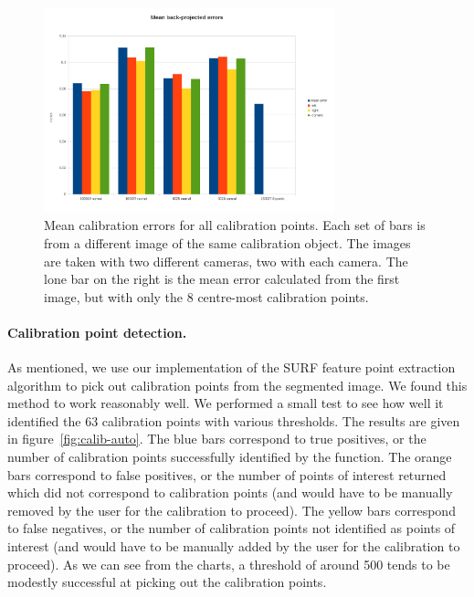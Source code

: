 \begin{figure}[htb]
  \centering
  \includegraphics[width=0.75\textwidth]{figures/calibration-means}
  \caption[Mean calibration errors]{Mean calibration errors for all
    calibration points. Each set of bars is from a different image of
    the same calibration object. The images are taken with two
    different cameras, two with each camera. The lone bar on the right
    is the mean error calculated from the first image, but with only
    the 8 centre-most calibration points.}
  \label{fig:calib-errors}
\end{figure}

\paragraph{Calibration point detection.}
As mentioned, we use our implementation of the SURF feature point extraction algorithm to pick out calibration points from the segmented image. We found this method to work reasonably well. We performed a small test to see how well it identified the 63 calibration points with various thresholds. The results are given in figure~\ref{fig:calib-auto}. The blue bars correspond to true positives, or the number of calibration points successfully identified by the function. The orange bars correspond to false positives, or the number of points of interest returned which did not correspond to calibration points (and would have to be manually removed by the user for the calibration to proceed). The yellow bars correspond to false negatives, or the number of calibration points not identified as points of interest (and would have to be manually added by the user for the calibration to proceed). As we can see from the charts, a threshold of around 500 tends to be modestly successful at picking out the calibration points.

